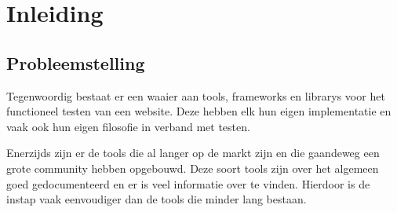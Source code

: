 
\chapter{Inleiding}
\label{ch:inleiding}





\section{Probleemstelling}
\label{sec:probleemstelling}
Tegenwoordig bestaat er een waaier aan \glspl{tool}, \glspl{framework} en \glspl{library} voor het functioneel testen van een website. Deze hebben elk hun eigen implementatie en vaak ook hun eigen filosofie in verband met testen. 

Enerzijds zijn er de \glspl{tool} die al langer op de markt zijn en die gaandeweg een grote community hebben opgebouwd. Deze soort \glspl{tool} zijn over het algemeen goed gedocumenteerd en er is veel informatie over te vinden. Hierdoor is de instap vaak eenvoudiger dan de \glspl{tool} die minder lang bestaan.

